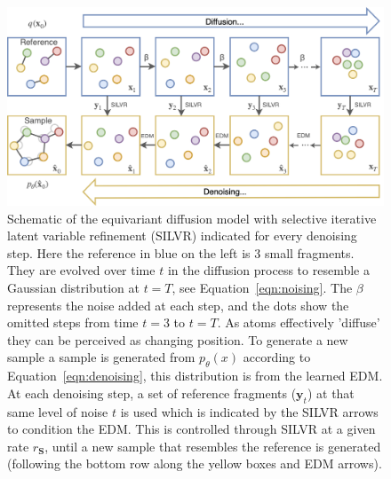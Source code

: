 \documentclass[journal=jacsat,manuscript=article]{achemso}
\begin{document}
\begin{figure}[h!]
    \centering
    \includegraphics[width=\textwidth]{paper/Figures/Fig1/Schematic_new.png}
    \caption{Schematic of the equivariant diffusion model with  selective iterative latent variable refinement (SILVR) indicated for every denoising step. Here the reference in blue on the left is 3 small fragments. They are evolved over time $t$ in the diffusion process to resemble a Gaussian distribution at $t=T$, see Equation~\ref{eqn:noising}. The $\beta$ represents the noise added at each step, and the dots show the omitted steps from time $t=3$ to $t=T$. As atoms effectively 'diffuse' they can be perceived as changing position. To generate a new sample a sample is generated from $p_{\theta}(x)$ according to Equation~\ref{eqn:denoising}, this distribution is from the learned EDM. At each denoising step, a set of reference fragments ($\mathbf{y}_t$) at that same level of noise $t$ is used which is indicated by the SILVR arrows to condition the EDM. This is controlled through SILVR at a given rate $r_{\mathbf{S}}$, until a new sample that resembles the reference is generated (following the bottom row along the yellow boxes and EDM arrows).}
    \label{fig:schematic}
\end{figure}
\end{document}
